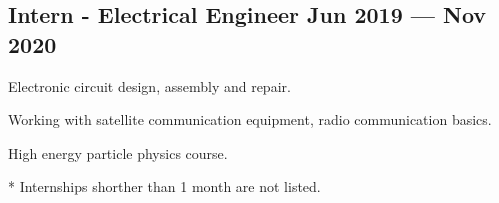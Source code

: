 \documentclass[letter,10pt]{article}
\begin{document}
\subsection{{Intern - Electrical Engineer \hfill Jun 2019 --- Nov 2020}}
\begin{zitemize}
\item Electronic circuit design, assembly and repair.
\item Working with satellite communication equipment, radio communication basics.
\item High energy particle physics course.
\end{zitemize}

* Internships shorther than 1 month are not listed.
\end{document}
